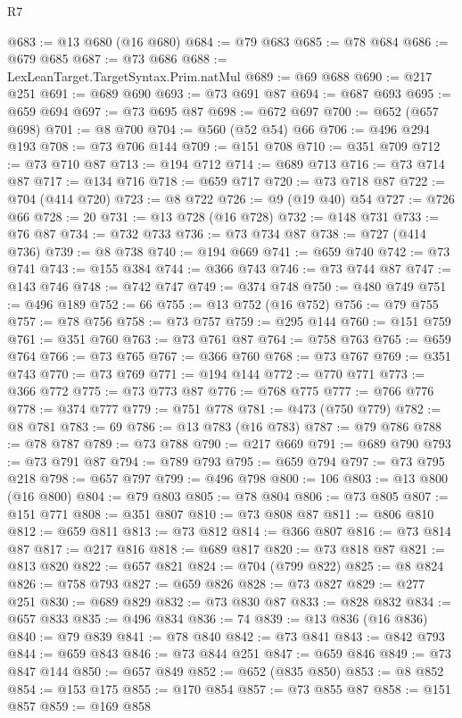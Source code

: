 \begin{lexlean}{R7}
\begin{coremodule}
@683 := @13 @680 (@16 @680)
@684 := @79 @683
@685 := @78 @684
@686 := @679 @685
@687 := @73 @686
@688 := LexLeanTarget.TargetSyntax.Prim.natMul
@689 := @69 @688
@690 := @217 @251
@691 := @689 @690
@693 := @73 @691 @87
@694 := @687 @693
@695 := @659 @694
@697 := @73 @695 @87
@698 := @672 @697
@700 := @652 (@657 @698)
@701 := @8 @700
@704 := @560 (@52 @54) @66
@706 := @496 @294 @193
@708 := @73 @706 @144
@709 := @151 @708
@710 := @351 @709
@712 := @73 @710 @87
@713 := @194 @712
@714 := @689 @713
@716 := @73 @714 @87
@717 := @134 @716
@718 := @659 @717
@720 := @73 @718 @87
@722 := @704 (@414 @720)
@723 := @8 @722
@726 := @9 (@19 @40) @54
@727 := @726 @66
@728 := 20
@731 := @13 @728 (@16 @728)
@732 := @148 @731
@733 := @76 @87
@734 := @732 @733
@736 := @73 @734 @87
@738 := @727 (@414 @736)
@739 := @8 @738
@740 := @194 @669
@741 := @659 @740
@742 := @73 @741
@743 := @155 @384
@744 := @366 @743
@746 := @73 @744 @87
@747 := @143 @746
@748 := @742 @747
@749 := @374 @748
@750 := @480 @749
@751 := @496 @189
@752 := 66
@755 := @13 @752 (@16 @752)
@756 := @79 @755
@757 := @78 @756
@758 := @73 @757
@759 := @295 @144
@760 := @151 @759
@761 := @351 @760
@763 := @73 @761 @87
@764 := @758 @763
@765 := @659 @764
@766 := @73 @765
@767 := @366 @760
@768 := @73 @767
@769 := @351 @743
@770 := @73 @769
@771 := @194 @144
@772 := @770 @771
@773 := @366 @772
@775 := @73 @773 @87
@776 := @768 @775
@777 := @766 @776
@778 := @374 @777
@779 := @751 @778
@781 := @473 (@750 @779)
@782 := @8 @781
@783 := 69
@786 := @13 @783 (@16 @783)
@787 := @79 @786
@788 := @78 @787
@789 := @73 @788
@790 := @217 @669
@791 := @689 @790
@793 := @73 @791 @87
@794 := @789 @793
@795 := @659 @794
@797 := @73 @795 @218
@798 := @657 @797
@799 := @496 @798
@800 := 106
@803 := @13 @800 (@16 @800)
@804 := @79 @803
@805 := @78 @804
@806 := @73 @805
@807 := @151 @771
@808 := @351 @807
@810 := @73 @808 @87
@811 := @806 @810
@812 := @659 @811
@813 := @73 @812
@814 := @366 @807
@816 := @73 @814 @87
@817 := @217 @816
@818 := @689 @817
@820 := @73 @818 @87
@821 := @813 @820
@822 := @657 @821
@824 := @704 (@799 @822)
@825 := @8 @824
@826 := @758 @793
@827 := @659 @826
@828 := @73 @827
@829 := @277 @251
@830 := @689 @829
@832 := @73 @830 @87
@833 := @828 @832
@834 := @657 @833
@835 := @496 @834
@836 := 74
@839 := @13 @836 (@16 @836)
@840 := @79 @839
@841 := @78 @840
@842 := @73 @841
@843 := @842 @793
@844 := @659 @843
@846 := @73 @844 @251
@847 := @659 @846
@849 := @73 @847 @144
@850 := @657 @849
@852 := @652 (@835 @850)
@853 := @8 @852
@854 := @153 @175
@855 := @170 @854
@857 := @73 @855 @87
@858 := @151 @857
@859 := @169 @858

\end{coremodule}
\end{lexlean}
